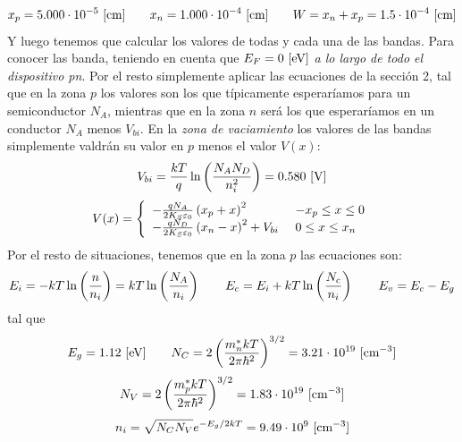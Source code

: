 \begin{enumerate}[label=\alph*)]
    \begin{equation}
        x_p = 5.000\cdot 10^{-5}  \ [\text{cm}] \qquad x_n =1.000\cdot 10^{-4}  \ [\text{cm}] \qquad W = x_n + x_p = 1.5 \cdot 10^{-4} \ [\text{cm} ]
    \end{equation}
    Y luego tenemos que calcular los valores de todas y cada una de las bandas. Para conocer las banda, teniendo en cuenta que $E_F=0 \ [\text{eV}]$  \textit{a lo largo de todo el dispositivo pn}. Por el resto simplemente aplicar las ecuaciones de la sección 2, tal que en la zona $p$ los valores son los que típicamente esperaríamos para un semiconductor $N_A$, mientras que en la zona $n$ será los que esperaríamos en un conductor $N_A$ menos $V_{bi}$. En la \textit{zona de vaciamiento} los valores de las bandas simplemente valdrán su valor en $p$ menos el valor $V(x)$:
    \begin{equation*}
        V_{bi} = \frac{kT}{q} \ln \parentesis{\frac{N_AN_D}{n_i^2}} = 0.580 \ [\unit{V}]
    \end{equation*}
    \begin{equation*}
        V(x) = \left\lbrace \begin{array}{ll}
            - \frac{qN_A}{2K_S\varepsilon_0} \left( x_p + x \right)^2  & \ - x_p \leq x \leq 0 \\
            - \frac{qN_D}{2K_S\varepsilon_0} \left( x_n - x \right)^2 + V_{bi}  & \ 0 \leq x \leq x_n \\
        \end{array} \right.
    \end{equation*}
    Por el resto de situaciones, tenemos que en la zona $p$ las ecuaciones son:
    \begin{equation*}
        E_i = - kT \ln \left( \frac{n}{n_i} \right) = kT \ln \left( \frac{N_A}{n_i} \right) \qquad E_c  = E_i  + kT \ln \left( \frac{N_c}{n_i}  \right) \qquad E_v  =E_c-E_g
    \end{equation*}
    tal que 
    \begin{equation*}
        E_g = 1.12 \ [\eV] \qquad N_C = 2 \parentesis{\frac{m_n^* kT}{2\pi \hbar^2}}^{3/2}  = 3.21 \cdot 10^{19} \ [\cm^{-3}] \end{equation*}
    \begin{equation*}    
       N_V = 2 \left( \frac{m_p^* kT}{2\pi \hbar^2} \right)^{3/2} = 1.83 \cdot 10^{19} \ [\text{cm}^{-3}] 
    \end{equation*}
    \begin{equation*}
        n_i = \sqrt{N_CN_V} e^{-E_g/2kT} = 9.49 \cdot 10^9 \ [\text{cm}^{-3}]
    \end{equation*}

\end{enumerate}
